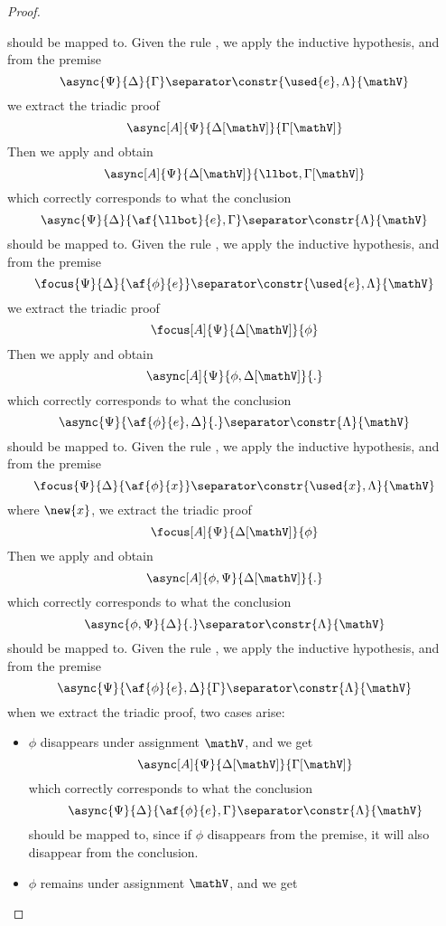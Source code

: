 \begin{proof}
\begin{itemize}
			should be mapped to.
		\indCase{\displaybot} Given the rule \derRule{\displaybot}, we apply the inductive hypothesis, and from the premise
			$$ \async{\Psi}{\Delta}{\Gamma} \separator \constr{\used{e}, \Lambda}{\mathV} $$
			we extract the triadic proof
			$$ \async[A]{\Psi}{\Delta[\mathV]}{\Gamma[\mathV]} $$
			Then we apply \derRule[A]{\displaybot} and obtain
			$$ \async[A]{\Psi}{\Delta[\mathV]}{\llbot, \Gamma[\mathV]} $$
			which correctly corresponds to what the conclusion
			$$ \async{\Psi}{\Delta}{\af{\llbot}{e}, \Gamma} \separator \constr{\Lambda}{\mathV} $$
			should be mapped to.
		\indCase{\displaydecide[1]} Given the rule \derRule{\displaydecide[1]}, we apply the inductive hypothesis, and from the premise
			$$ \focus{\Psi}{\Delta}{\af{\phi}{e}} \separator \constr{\used{e}, \Lambda}{\mathV} $$
			we extract the triadic proof
			$$ \focus[A]{\Psi}{\Delta[\mathV]}{\phi} $$
			Then we apply \derRule[A]{\displaydecide[1]} and obtain
			$$ \async[A]{\Psi}{\phi, \Delta[\mathV]}{.} $$
			which correctly corresponds to what the conclusion
			$$ \async{\Psi}{\af{\phi}{e}, \Delta}{.} \separator \constr{\Lambda}{\mathV} $$
			should be mapped to.
		\indCase{\displaydecide[2]} Given the rule \derRule{\displaydecide[2]}, we apply the inductive hypothesis, and from the premise
			$$ \focus{\Psi}{\Delta}{\af{\phi}{x}} \separator \constr{\used{x}, \Lambda}{\mathV} $$
			where $\new{x}$, we extract the triadic proof
			$$ \focus[A]{\Psi}{\Delta[\mathV]}{\phi} $$
			Then we apply \derRule[A]{\displaydecide[2]} and obtain
			$$ \async[A]{\phi, \Psi}{ \Delta[\mathV]}{.} $$
			which correctly corresponds to what the conclusion
			$$ \async{\phi, \Psi}{\Delta}{.} \separator \constr{\Lambda}{\mathV} $$
			should be mapped to.
		\indCase{\displaytodelta} Given the rule \derRule{\displaytodelta}, we apply the inductive hypothesis, and from the premise
			$$ \async{\Psi}{\af{\phi}{e}, \Delta}{\Gamma} \separator \constr{\Lambda}{\mathV} $$
			when we extract the triadic proof, two cases arise:
			\begin{itemize}
				\item $\phi$ disappears under assignment $\mathV$, and we get
					$$ \async[A]{\Psi}{\Delta[\mathV]}{\Gamma[\mathV]} $$
					which correctly corresponds to what the conclusion
					$$ \async{\Psi}{\Delta}{\af{\phi}{e}, \Gamma} \separator \constr{\Lambda}{\mathV} $$
					should be mapped to, since if $\phi$ disappears from the premise, it will also disappear from the conclusion.
				\item $\phi$ remains under assignment $\mathV$, and we get

\end{itemize}
\end{itemize}
\end{proof}

